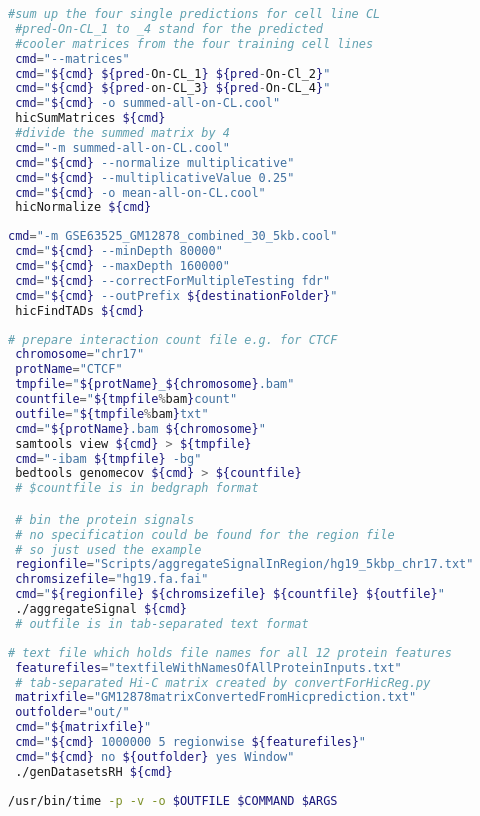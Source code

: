 \begin{appendices}
\begin{lstlisting}[language=bash, caption=compute mean prediction, label=list:methods:averagePredictions]
 #sum up the four single predictions for cell line CL
 #pred-On-CL_1 to _4 stand for the predicted
 #cooler matrices from the four training cell lines
 cmd="--matrices"
 cmd="${cmd} ${pred-On-CL_1} ${pred-On-Cl_2}"
 cmd="${cmd} ${pred-on-CL_3} ${pred-On-CL_4}"
 cmd="${cmd} -o summed-all-on-CL.cool"
 hicSumMatrices ${cmd}
 #divide the summed matrix by 4
 cmd="-m summed-all-on-CL.cool"
 cmd="${cmd} --normalize multiplicative"
 cmd="${cmd} --multiplicativeValue 0.25"
 cmd="${cmd} -o mean-all-on-CL.cool"
 hicNormalize ${cmd}
\end{lstlisting}

\begin{lstlisting}[language=bash,caption=command for finding TADs on GM12878,label=methods:list:TADs]
 cmd="-m GSE63525_GM12878_combined_30_5kb.cool"
 cmd="${cmd} --minDepth 80000"
 cmd="${cmd} --maxDepth 160000"
 cmd="${cmd} --correctForMultipleTesting fdr"
 cmd="${cmd} --outPrefix ${destinationFolder}"
 hicFindTADs ${cmd}
\end{lstlisting}

\begin{lstlisting}[language=bash,caption=preparing inputs for HiC-Reg  (example),label=methods:list:hicregInputs]
 # prepare interaction count file e.g. for CTCF
 chromosome="chr17"
 protName="CTCF"
 tmpfile="${protName}_${chromosome}.bam"
 countfile="${tmpfile%bam}count"
 outfile="${tmpfile%bam}txt"
 cmd="${protName}.bam ${chromosome}"
 samtools view ${cmd} > ${tmpfile}
 cmd="-ibam ${tmpfile} -bg"
 bedtools genomecov ${cmd} > ${countfile}
 # $countfile is in bedgraph format

 # bin the protein signals
 # no specification could be found for the region file
 # so just used the example
 regionfile="Scripts/aggregateSignalInRegion/hg19_5kbp_chr17.txt"
 chromsizefile="hg19.fa.fai"
 cmd="${regionfile} ${chromsizefile} ${countfile} ${outfile}"
 ./aggregateSignal ${cmd}
 # outfile is in tab-separated text format
\end{lstlisting}

\begin{lstlisting}[language=bash,caption=computing window features for HiC-Reg (example),label=methods:list:hicregWindow]
 # text file which holds file names for all 12 protein features
 featurefiles="textfileWithNamesOfAllProteinInputs.txt"
 # tab-separated Hi-C matrix created by convertForHicReg.py
 matrixfile="GM12878matrixConvertedFromHicprediction.txt"
 outfolder="out/"
 cmd="${matrixfile}"
 cmd="${cmd} 1000000 5 regionwise ${featurefiles}"
 cmd="${cmd} no ${outfolder} yes Window"
 ./genDatasetsRH ${cmd}
\end{lstlisting}

\begin{lstlisting}[language=bash,caption=measuring ressource consumption,label=methods:list:usrbintime]
 /usr/bin/time -p -v -o $OUTFILE $COMMAND $ARGS
\end{lstlisting}

\end{appendices}